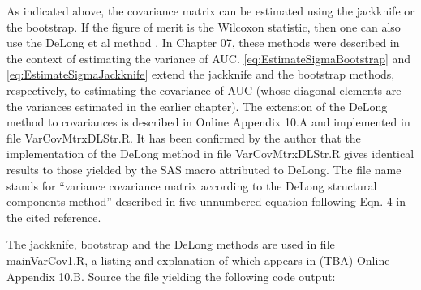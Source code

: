 \documentclass[
]{book}
\begin{document}
As indicated above, the covariance matrix can be estimated using the jackknife or the bootstrap. If the figure of merit is the Wilcoxon statistic, then one can also use the DeLong et al method \citep{RN112}. In Chapter 07, these methods were described in the context of estimating the variance of AUC. \eqref{eq:EstimateSigmaBootstrap} and \eqref{eq:EstimateSigmaJackknife} extend the jackknife and the bootstrap methods, respectively, to estimating the covariance of AUC (whose diagonal elements are the variances estimated in the earlier chapter). The extension of the DeLong method to covariances is described in Online Appendix 10.A and implemented in file VarCovMtrxDLStr.R. It has been confirmed by the author that the implementation of the DeLong method \citep{RN112} in file VarCovMtrxDLStr.R gives identical results to those yielded by the SAS macro attributed to DeLong. The file name stands for ``variance covariance matrix according to the DeLong structural components method'' described in five unnumbered equation following Eqn. 4 in the cited reference.

The jackknife, bootstrap and the DeLong methods are used in file mainVarCov1.R, a listing and explanation of which appears in (TBA) Online Appendix 10.B. Source the file yielding the following code output:
\end{document}
